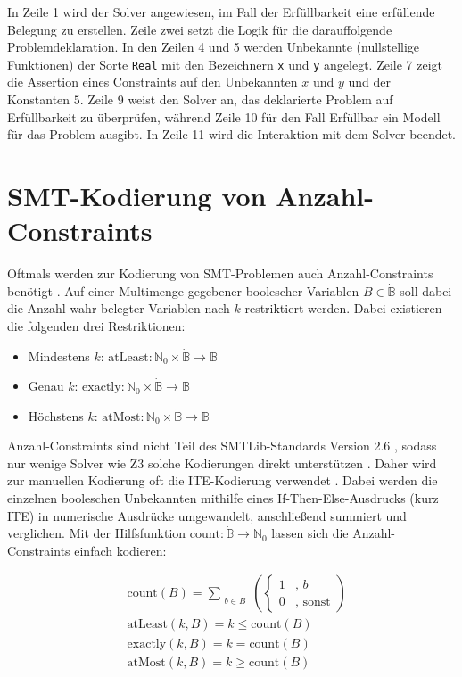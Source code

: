 In Zeile 1 wird der Solver angewiesen, im Fall der Erfüllbarkeit eine erfüllende Belegung zu erstellen.
Zeile zwei setzt die Logik für die darauffolgende Problemdeklaration.
In den Zeilen 4 und 5 werden Unbekannte (nullstellige Funktionen) der Sorte \texttt{Real} mit den Bezeichnern \texttt{x} und \texttt{y} angelegt.
Zeile 7 zeigt die Assertion eines Constraints auf den Unbekannten $x$ und $y$ und der Konstanten $5$.
Zeile 9 weist den Solver an, das deklarierte Problem auf Erfüllbarkeit zu überprüfen, während Zeile 10 für den Fall Erfüllbar ein Modell für das Problem ausgibt.
In Zeile 11 wird die Interaktion mit dem Solver beendet.

\section{SMT-Kodierung von Anzahl-Constraints}
\label{sec:smtcardinality}
Oftmals werden zur Kodierung von SMT-Problemen auch Anzahl-Constraints benötigt \cite{kovasznai}.
Auf einer Multimenge gegebener boolescher Variablen $B \in \dot{\mathbb{B}}$ soll dabei die Anzahl wahr belegter Variablen nach $k$ restriktiert werden.
Dabei existieren die folgenden drei Restriktionen:
\begin{itemize}
    \item Mindestens $k$: $\text{atLeast}: \mathbb{N}_0 \times \dot{\mathbb{B}} \rightarrow \mathbb{B}$
    \item Genau $k$: $\text{exactly}: \mathbb{N}_0 \times \dot{\mathbb{B}} \rightarrow \mathbb{B}$
    \item Höchstens $k$: $\text{atMost}: \mathbb{N}_0 \times \dot{\mathbb{B}} \rightarrow \mathbb{B}$
\end{itemize}

Anzahl-Constraints sind nicht Teil des SMTLib-Standards Version 2.6 \cite{smtlib}, sodass nur wenige Solver wie Z3 solche Kodierungen direkt unterstützen \cite{z3Cardinality}.
Daher wird zur manuellen Kodierung oft die ITE-Kodierung verwendet \cite{kovasznai}.
Dabei werden die einzelnen booleschen Unbekannten mithilfe eines If-Then-Else-Ausdrucks (kurz \gls{ITE}) in numerische Ausdrücke umgewandelt, anschließend summiert und verglichen.
Mit der Hilfsfunktion $\text{count}: \dot{\mathbb{B}} \rightarrow \mathbb{N}_0$ lassen sich die Anzahl-Constraints einfach kodieren:

\[
    \begin{aligned}
        & \text{count}(B) = \sum_{\substack{b \in B}}
            \left(
                \begin{cases}
                    1 & \text{, } b \\
                    0 & \text{, sonst}
                \end{cases}
            \right) \\[5pt]
        & \text{atLeast}(k, B) = k \leq \text{count}(B) \\[5pt]
        & \text{exactly}(k, B) = k = \text{count}(B) \\[5pt]
        & \text{atMost}(k, B) = k \geq \text{count}(B)
    \end{aligned}
\]

